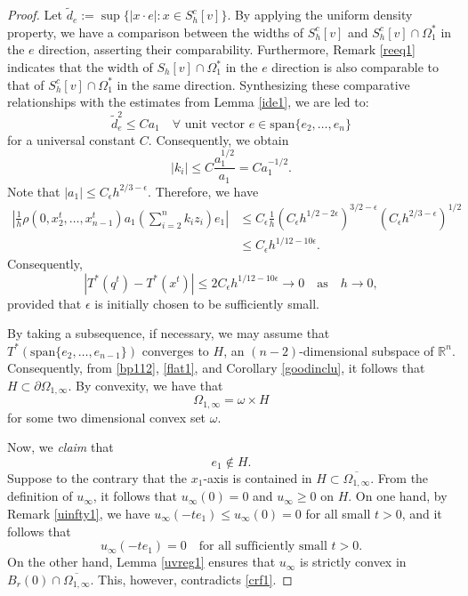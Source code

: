 \documentclass[11pt]{amsart}
\theoremstyle{plain}
\newcommand{\0}{\textbf{0}}
\numberwithin{equation}{section}
\numberwithin{equation}{section}
\numberwithin{figure}{section}
\begin{document}
\begin{proof}
Let \(\tilde{d}_e:=\sup\{|x \cdot e| : x \in S_h^c[v]\}\).
By applying the uniform density property, we have a comparison between the widths of \(S_h^c[v]\) and \(S_h^c[v]\cap\Omega_1^*\) in the \(e\) direction, asserting their comparability. Furthermore, Remark \ref{reeq1} indicates that the width of \(S_h[v]\cap \Omega_1^*\) in the \(e\) direction is also comparable to that of \(S_h^c[v]\cap\Omega_1^*\) in the same direction.
Synthesizing these comparative relationships with the estimates from Lemma \ref{ide1}, we are led to:
\begin{equation}\label{wid111}
\tilde{d}_e^2 \leq C a_1 \quad \forall \text{ unit vector } e \in \text{span}\{e_2, \ldots, e_n\}
\end{equation}
for a universal constant $C.$
Consequently, we obtain
\begin{equation}\label{estwid21}
|k_i| \leq C\frac{a_1^{1/2}}{a_1} = C a_1^{-1/2}.
\end{equation}
Note that \(|a_1| \leq C_\epsilon h^{2/3 - \epsilon}\). Therefore, we have
\begin{align*}
\left|\frac{1}{h} \rho(0, x_2^t, \ldots, x_{n-1}^t) a_1 \left(\sum_{i=2}^n k_i z_i\right) e_1\right| &\leq C_\epsilon \frac{1}{h} \left(C_\epsilon h^{1/2 - 2\epsilon}\right)^{3/2 - \epsilon} \left(C_\epsilon h^{2/3 - \epsilon}\right)^{1/2}\\
&\leq C_\epsilon h^{1/12 - 10\epsilon}.
\end{align*}
Consequently, 
\begin{equation}\label{flat1}
|T^*(q^t) - T^*(x^t)| \leq 2C_\epsilon h^{1/12 - 10\epsilon} \rightarrow 0 \quad \text{as} \quad h \rightarrow 0,
\end{equation}
provided that \(\epsilon\) is initially chosen to be sufficiently small. 


By taking a subsequence, if necessary, we may assume that \(T^*(\text{span}\{e_2, \ldots, e_{n-1}\})\) converges to \(H\), an \((n-2)\)-dimensional subspace of \(\mathbb{R}^n\). Consequently, from \eqref{bp112}, \eqref{flat1}, and Corollary \ref{goodinclu}, it follows that \(H \subset \partial \Omega_{1,\infty}\). 
By convexity, we have that 
\begin{equation}\label{o1split}
\Omega_{1,\infty}=\omega\times H
\end{equation}
 for some two dimensional convex set $\omega.$

Now, we \emph{claim} that
\begin{equation}\label{gp11}
e_1 \notin H.
\end{equation}
Suppose to the contrary that the $x_1$-axis is contained in $H \subset \overline{\Omega_{1,\infty}}$. From the definition of $u_\infty$, it follows that $u_\infty(0) = 0$ and $u_\infty \geq 0$ on $H$. On one hand, by Remark \ref{uinfty1}, we have $u_\infty(-te_1) \leq u_\infty(0)=0$ for all small $t > 0$, and it follows that
\begin{equation}\label{crf1}
u_\infty(-te_1) = 0 \quad \text{for all sufficiently small } t > 0.
\end{equation}
On the other hand, Lemma \ref{uvreg1} ensures that $u_\infty$ is strictly convex in $B_r(0) \cap \overline{\Omega_{1,\infty}}$. This, however, contradicts \eqref{crf1}.



\end{proof}
\end{document}

